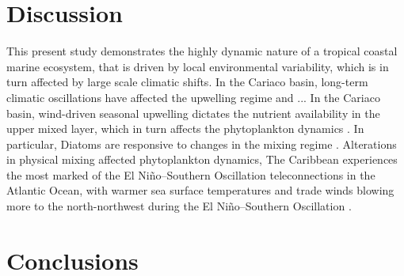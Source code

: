 \documentclass[draft]{agujournal2019}
\begin{document}
\section{Discussion}
This present study demonstrates the highly dynamic nature of a tropical coastal marine ecosystem, that is driven by local environmental variability, which is in turn affected by large scale climatic shifts. In the Cariaco basin, long-term climatic oscillations have affected the upwelling regime and ...
In the Cariaco basin, wind-driven seasonal upwelling dictates the nutrient availability in the upper mixed layer, which in turn affects the phytoplankton dynamics \cite{ptacnik_diversity_2008, bopp_response_2005}. In particular, Diatoms are responsive to changes in the mixing regime \cite{huisman_reduced_2006}.
Alterations in physical mixing affected phytoplankton dynamics,
The Caribbean experiences the most marked of the El Niño–Southern Oscillation teleconnections in the Atlantic Ocean, with warmer sea surface temperatures and trade winds blowing more to the north-northwest during the El Niño–Southern Oscillation \cite{enfield_tropical_1997}.


\section{Conclusions}






%
%
\end{document}
